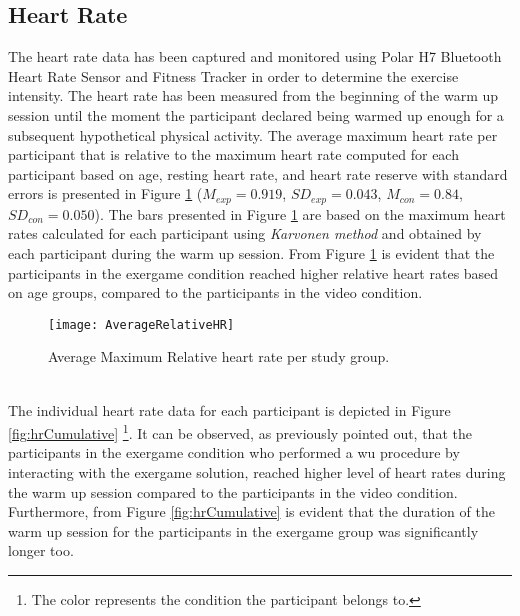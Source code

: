 \subsection{Heart Rate}
The heart rate data has been captured and monitored using Polar H7 Bluetooth Heart Rate Sensor and Fitness Tracker in order to determine the exercise intensity. The heart rate has been measured from the beginning of the warm up session until the moment the participant declared being warmed up enough for a subsequent hypothetical physical activity. The average maximum heart rate per participant that is relative to the maximum heart rate computed for each participant based on age, resting heart rate, and heart rate reserve with standard errors is presented in Figure \ref{fig:hrdata} (\begin{math}M_{exp}= 0.919 \end{math},	\begin{math} SD_{exp}= 0.043\end{math}, \begin{math}  M_{con}= 0.84\end{math},	\begin{math} SD_{con}= 0.050\end{math}). The bars presented in Figure \ref{fig:hrdata} are based on  the maximum heart rates calculated for each participant using \textit{Karvonen method}  \cite{tanaka2001age} and obtained by each participant during the warm up session. From Figure \ref{fig:hrdata} is evident that the participants in the exergame condition reached higher relative heart rates based on age groups, compared to the participants in the video condition.\\ %
\begin{figure}[h]
    \centering
    \texttt{[image: AverageRelativeHR]}
    \caption{Average Maximum Relative heart rate per study group.}
    \label{fig:hrdata}
\end{figure}\\
The individual heart rate data for each participant is depicted in Figure \ref{fig:hrCumulative}  \footnote{The color represents the condition the participant belongs to.}. It can be observed, as previously pointed out, that the participants in the exergame condition who performed a \acrshort{wu} procedure by interacting with the exergame solution, reached higher level of heart rates during the warm up session compared to the participants in the video condition. Furthermore, from Figure \ref{fig:hrCumulative} is evident that the duration of the warm up session for the participants in the exergame group was significantly longer too.
